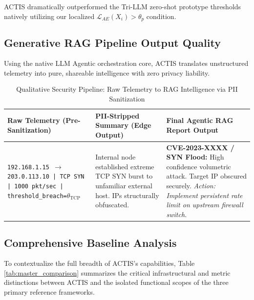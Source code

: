 \documentclass[conference]{IEEEtran}
\begin{document}
ACTIS dramatically outperformed the Tri-LLM zero-shot prototype thresholds natively utilizing our localized $\mathcal{L}_{AE}(X_i) > \theta_p$ condition.

\subsection{Generative RAG Pipeline Output Quality}
Using the native LLM Agentic orchestration core, ACTIS translates unstructured telemetry into pure, shareable intelligence with zero privacy liability.

\begin{table}[htbp]
\centering
\caption{Qualitative Security Pipeline: Raw Telemetry to RAG Intelligence via PII Sanitization}
\begin{tabularx}{\textwidth}{|X|X|X|}
\hline
\textbf{Raw Telemetry (Pre-Sanitization)} & \textbf{PII-Stripped Summary (Edge Output)} & \textbf{Final Agentic RAG Report Output} \\
\hline
\texttt{192.168.1.15 $\rightarrow$ 203.0.113.10 | TCP SYN | 1000 pkt/sec | threshold\_breach=$\theta_{\text{TCP}}$} & 
Internal node established extreme TCP SYN burst to unfamiliar external host. IPs structurally obfuscated. & 
\textbf{CVE-2023-XXXX / SYN Flood:} High confidence volumetric attack. Target IP obscured securely. \textit{Action: Implement persistent rate limit on upstream firewall switch.} \\
\hline
\end{tabularx}
\label{tab:qualitative}
\end{table}

\subsection{Comprehensive Baseline Analysis}
To contextualize the full breadth of ACTIS's capabilities, Table \ref{tab:master_comparison} summarizes the critical infrastructural and metric distinctions between ACTIS and the isolated functional scopes of the three primary reference frameworks.
\end{document}
